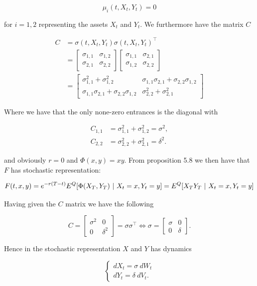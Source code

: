 \documentclass[
]{article}
\begin{document}
\[
\mu_i(t,X_t,Y_t)=0
\]

for \(i=1,2\) representing the assets \(X_t\) and \(Y_t\). We
furthermore have the matrix \(C\)

\begin{align*}
C&=\sigma(t,X_t,Y_t)\sigma(t,X_t,Y_t)^\top\\
&=
\begin{bmatrix}
\sigma_{1,1} &\sigma_{1,2}\\
\sigma_{2,1}& \sigma_{2,2}
\end{bmatrix}\begin{bmatrix}
\sigma_{1,1} &\sigma_{2,1}\\
\sigma_{1,2}& \sigma_{2,2}
\end{bmatrix}\\
&=
\begin{bmatrix}
\sigma_{1,1}^2+\sigma_{1,2}^2 & \sigma_{1,1}\sigma_{2,1}+\sigma_{2,2}\sigma_{1,2}\\
\sigma_{1,1}\sigma_{2,1}+\sigma_{2,2}\sigma_{1,2} & \sigma_{2,2}^2+\sigma_{2,1}^2
\end{bmatrix}
\end{align*}

Where we have that the only none-zero entrances is the diagonal with

\begin{align*}
C_{1,1}&=\sigma_{1,1}^2+\sigma_{1,2}^2 = \sigma^2,\\
C_{2,2}&=\sigma_{2,2}^2+\sigma_{2,1}^2=\delta^2.
\end{align*}

and obviously \(r=0\) and \(\Phi(x,y)=xy\). From proposition 5.8 we then
have that \(F\) has stochastic representation:

\[
F(t,x,y)=e^{-r(T-t)}E^Q[\Phi(X_T,Y_T)\ \vert\ X_t=x,Y_t=y]\\
=E^Q[X_TY_T\ \vert\ X_t=x,Y_t=y]
\]

Having given the \(C\) matrix we have the following

\[
C=
\begin{bmatrix}
\sigma^2 & 0\\
0 & \delta^2
\end{bmatrix}=\sigma\sigma ^\top\iff\sigma =
\begin{bmatrix}
\sigma & 0\\
0 & \delta
\end{bmatrix}.
\]

Hence in the stochastic representation \(X\) and \(Y\) has dynamics

\[
\left\{
\begin{matrix}
dX_t=\sigma\ dW_t\\
dY_t=\delta\ dV_t.
\end{matrix}
\right.
\]
\end{document}
